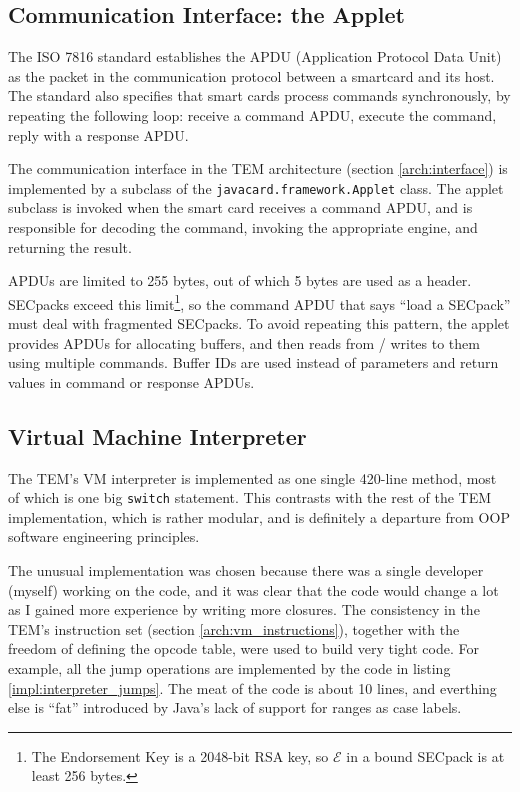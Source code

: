\subsection{Communication Interface: the Applet}
The ISO 7816 standard establishes the APDU (Application Protocol Data Unit) as
the packet in the communication protocol between a smartcard and its host. The
standard also specifies that smart cards process commands synchronously, by
repeating the following loop: receive a command APDU, execute the command,
reply with a response APDU.
 
The communication interface in the TEM architecture (section
\ref{arch:interface}) is implemented by a subclass of the
\texttt{javacard.framework.Applet} class. The applet subclass is invoked when
the smart card receives a command APDU, and is responsible for decoding the
command, invoking the appropriate engine, and returning the result.

APDUs are limited to 255 bytes, out of which 5 bytes are used as a header.
SECpacks exceed this limit\footnote{The Endorsement Key is a 2048-bit RSA key,
so $\mathcal E$ in a bound SECpack is at least 256 bytes.}, so the command APDU
that says ``load a SECpack'' must deal with fragmented SECpacks. To avoid
repeating this pattern, the applet provides APDUs for allocating buffers, and
then reads from / writes to them using multiple commands. Buffer IDs are
used instead of parameters and return values in command or response APDUs.

\subsection{Virtual Machine Interpreter}
The TEM's VM interpreter is implemented as one single 420-line method, most of
which is one big \texttt{switch} statement. This contrasts with the rest of the
TEM implementation, which is rather modular, and is definitely a departure from
OOP software engineering principles.

The unusual implementation was chosen because there was a single developer
(myself) working on the code, and it was clear that the code would change a lot
as I gained more experience by writing more closures. The consistency in the
TEM's instruction set (section \ref{arch:vm_instructions}), together with the
freedom of defining the opcode table, were used to build very tight code.
For example, all the jump operations are implemented by the code in listing
\ref{impl:interpreter_jumps}. The meat of the code is about 10 lines, and
everthing else is ``fat'' introduced by Java's lack of support for ranges as
case labels.

